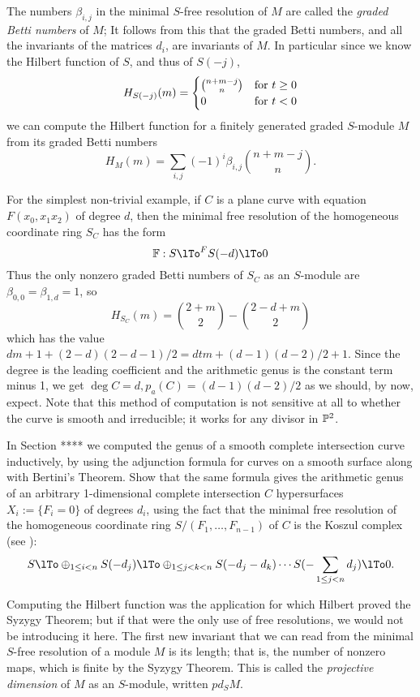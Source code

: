 The numbers $\beta_{i,j}$ in  the minimal $S$-free resolution of $M$ are called the \emph{graded Betti numbers} of $M$; It follows from this that the graded Betti numbers, and all the invariants of the matrices $d_{i}$, are invariants of $M$. In particular since we know the Hilbert function of $S$, and thus of $S(-j)$,
$$
H_{S(-j)}(m) = 
\begin{cases}
 {n+m-j \choose n} & \hbox{for $t\geq 0$}
  \\ 
 0 & \hbox{for $t<0$}
\end{cases}
$$
we can compute the Hilbert function for a finitely generated graded $S$-module $M$ from its graded Betti numbers 
$$
H_{M}(m) = \sum_{i,j} (-1)^{i}\beta_{i,j}{n+m-j\choose n}.
$$
\begin{example}  
For the simplest non-trivial example, if $C$ is a plane curve with equation $F(x_{0},x_{1}x_{2})$ of 
degree $d$, then the minimal free resolution of the homogeneous coordinate ring $S_{C}$ has the form
$$
\FF: S\lTo^{F}S(-d)\lTo 0
$$
Thus the only nonzero graded Betti numbers of $S_{C}$ as an $S$-module are
 $\beta_{0,0} = \beta_{1,d} = 1$, so
$$
 H_{S_{C}}(m) = {2+m\choose 2} - {2-d+m\choose 2}
 $$
 which has the value  $dm + 1+(2-d)(2-d-1)/2 = dtm+ (d-1)(d-2)/2 +1$. Since the degree is the leading coefficient and the arithmetic genus is the constant term minus 1, we get
$\deg C = d, p_{a}(C) = (d-1)(d-2)/2$ as we should, by now, expect. Note that this method of computation is not sensitive at all to whether the curve is smooth and irreducible; it works for any divisor in $\PP^{2}$.
\end{example}

\begin{exercise} In Section **** we computed the genus of a smooth complete intersection curve inductively, by using the adjunction formula for curves on a smooth surface along with Bertini's Theorem.
Show that the same formula gives the arithmetic genus of an arbitrary 1-dimensional complete intersection $C$ hypersurfaces 
$X_{i} := \{F_{i} = 0\}$ of degrees $d_{i}$,
using the fact that the minimal free resolution of the homogeneous coordinate ring 
$S/(F_{1}, \dots, F_{n-1})$ of $C$  is the Koszul complex (see \cite{???}):
$$
 S \lTo \oplus_{1\leq i<n}S(-d_{j}) \lTo  \oplus_{1\leq j<k<n}S(-d_{j}-d_{k}) \cdots S(-\sum_{1\leq j<n}d_{j})\lTo 0.
 $$
\end{exercise}

Computing the Hilbert function was the application for which Hilbert proved the Syzygy Theorem; but if that were the only use of free resolutions, we would not be introducing it here. The first new invariant that we can read from the minimal $S$-free resolution of a module $M$ is its length; that is, the number of nonzero maps, which is finite by the Syzygy Theorem. This is called the \emph{projective dimension} of $M$ as an $S$-module, written $pd_{S}M$. 


